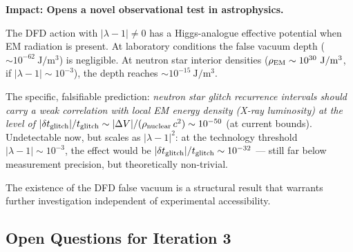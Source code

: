 \documentclass[aps,prd,twocolumn,superscriptaddress]{revtex4-2}
\newcommand{\lam}{|\lambda-1|}
\begin{document}
\begin{tcolorbox}[colback=purple!5!white,colframe=purple!75!black,title=
{Finding \#5: DFD False Vacuum Exists; Neutron Star Glitch Connection}]
\textbf{Impact: Opens a novel observational test in astrophysics.}

The DFD action with $\lam \neq 0$ has a Higgs-analogue effective
potential when EM radiation is present.  At laboratory conditions the
false vacuum depth ($\sim 10^{-62}~\mathrm{J/m^3}$) is negligible.
At neutron star interior densities ($\rho_{\rm EM} \sim 10^{30}~\mathrm{J/m^3}$,
if $\lam \sim 10^{-3}$), the depth reaches $\sim 10^{-15}~\mathrm{J/m^3}$.

The specific, falsifiable prediction: \emph{neutron star glitch recurrence
intervals should carry a weak correlation with local EM energy density
(X-ray luminosity) at the level of} $|\delta t_{\rm glitch}|/t_{\rm glitch}
\sim |\Delta V|/(\rho_{\rm nuclear}\,c^2) \sim 10^{-50}$ (at current bounds).
Undetectable now, but scales as $\lam^2$: at the technology threshold
$\lam \sim 10^{-3}$, the effect would be $|\delta t_{\rm glitch}|/t_{\rm glitch}
\sim 10^{-32}$ --- still far below measurement precision, but
theoretically non-trivial.

The existence of the DFD false vacuum is a structural result that warrants
further investigation independent of experimental accessibility.
\end{tcolorbox}

\subsection{Open Questions for Iteration 3}
\label{sec:open}
\end{document}
